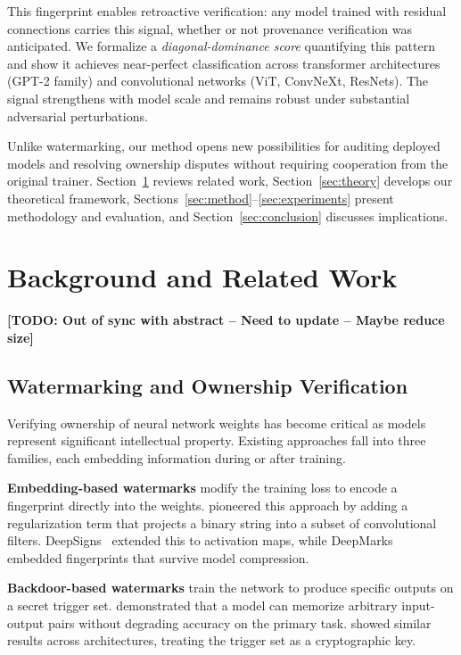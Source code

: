 \documentclass[wcp]{jmlr}
\begin{document}
This fingerprint enables retroactive verification: any model trained with residual connections carries this signal, whether or not provenance verification was anticipated. We formalize a \emph{diagonal-dominance score} quantifying this pattern and show it achieves near-perfect classification across transformer architectures (GPT-2 family) and convolutional networks (ViT, ConvNeXt, ResNets). The signal strengthens with model scale and remains robust under substantial adversarial perturbations.

Unlike watermarking, our method opens new possibilities for auditing deployed models and resolving ownership disputes without requiring cooperation from the original trainer. Section~\ref{sec:background} reviews related work, Section~\ref{sec:theory} develops our theoretical framework, Sections~\ref{sec:method}--\ref{sec:experiments} present methodology and evaluation, and Section~\ref{sec:conclusion} discusses implications.

\section{Background and Related Work}\label{sec:background}

{\color{red}\textbf{[TODO: Out of sync with abstract -- Need to update -- Maybe reduce size]}}

\subsection{Watermarking and Ownership Verification}

Verifying ownership of neural network weights has become critical as models represent significant intellectual property. Existing approaches fall into three families, each embedding information during or after training.

\textbf{Embedding-based watermarks} modify the training loss to encode a fingerprint directly into the weights. \citet{uchida2017embedding} pioneered this approach by adding a regularization term that projects a binary string into a subset of convolutional filters. DeepSigns~\citep{rouhani2019deepsigns} extended this to activation maps, while DeepMarks~\citep{chen2019deepmarks} embedded fingerprints that survive model compression.

\textbf{Backdoor-based watermarks} train the network to produce specific outputs on a secret trigger set. \citet{adi2018turning} demonstrated that a model can memorize arbitrary input-output pairs without degrading accuracy on the primary task. \citet{zhang2018protecting} showed similar results across architectures, treating the trigger set as a cryptographic key.
\end{document}
